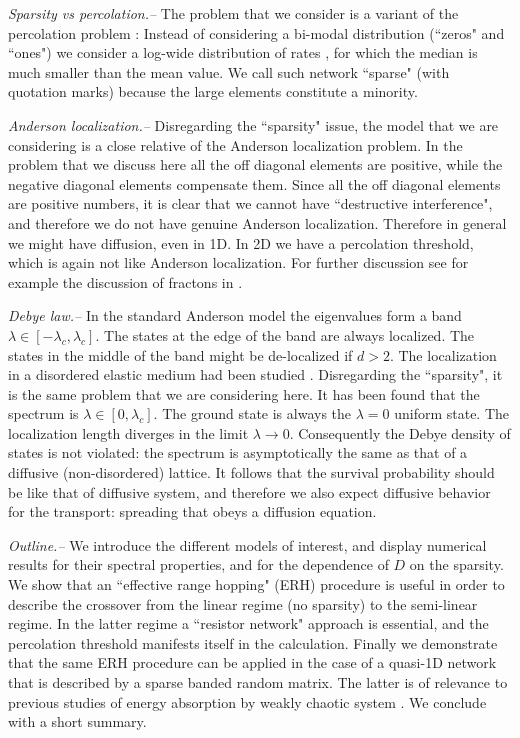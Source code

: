 \documentclass[onecolumn,fleqn,12pt,openany,draft]{book}
\begin{document}
{\em Sparsity vs percolation.-- }
The problem that we consider is a variant of the percolation problem \cite{aa1,aa2}:
Instead of considering a bi-modal distribution (``zeros" and ``ones")
we consider a log-wide distribution of rates \cite{Halp}, 
for which the median is much smaller than the mean value. 
We call such network ``sparse" (with quotation marks) because 
the large elements constitute a minority.

{\em Anderson localization.-- }
Disregarding the ``sparsity" issue, the model that we are considering 
is a close relative of the Anderson localization problem.
In the problem that we discuss here all the off diagonal elements 
are positive, while the negative diagonal elements compensate them.
%
Since all the  off diagonal elements are positive numbers, 
it is clear that we cannot have ``destructive interference", 
and therefore we do not have genuine Anderson localization. 
Therefore in general we might have diffusion, even in 1D. 
In 2D we have a percolation threshold, which is again 
not like Anderson localization. For further discussion see 
for example the discussion of fractons in \cite{havlin}.

{\em Debye law.-- }
In the standard Anderson model the eigenvalues form 
a band ${\lambda \in [-\lambda_c,\lambda_c]}$.
The states at the edge of the band are always localized.
The states in the middle of the band might be de-localized if ${d>2}$.  
%
The localization in a disordered elastic medium had been 
studied \cite{loc}. Disregarding the ``sparsity",  
it is the same problem that we are considering here.
It has been found that the spectrum is ${\lambda \in [0,\lambda_c]}$.
The ground state is always the ${\lambda=0}$ uniform state.
The localization length diverges in the limit ${\lambda \rightarrow 0}$.
Consequently the Debye density of states is not violated:
the spectrum is asymptotically the same as that of a 
diffusive (non-disordered) lattice. It follows that the 
survival probability should be like that of diffusive 
system, and therefore we also expect diffusive behavior
for the transport: spreading that obeys a diffusion equation.


{\em Outline.-- } We introduce the different models 
of interest, and display numerical results for their 
spectral properties, and for the dependence of $D$ on the sparsity.
We show that an ``effective range hopping" (ERH) procedure is 
useful in order to describe the crossover from the 
linear regime (no sparsity) to the semi-linear regime.
In the latter regime a ``resistor network"  approach 
is essential, and the percolation threshold manifests 
itself in the calculation. Finally we demonstrate that 
the same ERH procedure can be applied in the case of 
a quasi-1D network that is described by a sparse banded 
random matrix. The latter is of relevance to previous 
studies of energy absorption by weakly chaotic system \cite{slk}.
We conclude with a short summary.
 
\end{document}
